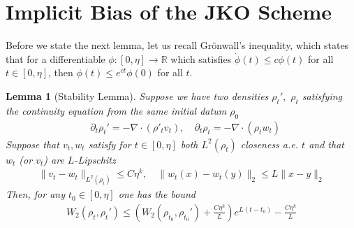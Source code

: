\documentclass[reqno,11pt,letterpaper]{amsart}
\theoremstyle{plain}
\newtheorem{lemma}{Lemma}
\theoremstyle{definition}
\theoremstyle{remark}
\begin{document}
\section{Implicit Bias of the JKO Scheme}\label{sec:IB_JKO}

Before we state the next lemma, let us recall Gr\"{o}nwall's inequality, which states that for a differentiable $\phi:[0,\eta] \to \mathbb{R}$ which satisfies $\dot{\phi}(t) \leq c \phi(t)$ for all $t\in [0,\eta]$, then $\phi(t) \leq e^{c t} \phi(0)$ for all $t$.

\begin{lemma}[Stability Lemma]\label{lem:stability}
Suppose we have two densities $\rho_{t}', \,\,\rho_{t}$ satisfying the continuity equation from the same initial datum $\rho_{0}$
\begin{align*}
    & \partial_{t}\rho_{t}' = - \nabla \cdot (\rho'_{t} v_{t} ), \quad \partial_{t}\rho_{t} = - \nabla \cdot (\rho_{t} w_{t} )
\end{align*}
Suppose that $v_{t},w_{t}$ satisfy for $t \in [0, \eta]$ both $L^{2}(\rho_{t})$ closeness a.e. $t$ and that $w_{t}$ (or $v_{t}$) are $L$-Lipschitz
\begin{align*}
    \lVert v_{t} - w_{t} \lVert_{L^{2}(\rho_{t})}  \leq C \eta^{k}, \quad \lVert w_{t}(x) - w_{t}(y) \rVert_{2} \leq L \lVert x - y \rVert_{2}
\end{align*}
Then, for any $t_{0} \in [0, \eta]$ one has the bound
\begin{align*}
    W_{2} (\rho_{t}, \rho_{t}') \leq \left( W_{2} (\rho_{t_0}, \rho_{t_0}' )  + \frac{C\eta^{k}}{L} \right) e^{L(t-t_{0})} - \frac{C\eta^{k}}{L}
\end{align*}
\end{lemma}
\end{document}
